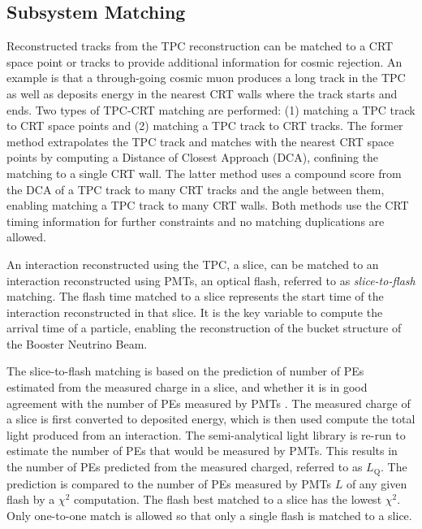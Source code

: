 \subsection{Subsystem Matching}
\label{sec:subsystem_match}


Reconstructed tracks from the TPC reconstruction can be matched to a CRT space point or tracks to provide additional information for cosmic rejection.
An example is that a through-going cosmic muon produces a long track in the TPC as well as deposits energy in the nearest CRT walls where the track starts and ends. 
Two types of TPC-CRT matching are performed: (1) matching a TPC track to CRT space points and (2) matching a TPC track to CRT tracks.
The former method extrapolates the TPC track and matches with the nearest CRT space points by computing a Distance of Closest Approach (DCA), confining the matching to a single CRT wall. 
The latter method uses a compound score from the DCA of a TPC track to many CRT tracks and the angle between them, enabling matching a TPC track to many CRT walls.
Both methods use the CRT timing information for further constraints and no matching duplications are allowed.

An interaction reconstructed using the TPC, a slice, can be matched to an interaction reconstructed using PMTs, an optical flash, referred to as \textit{slice-to-flash} matching.
The flash time matched to a slice represents the start time of the interaction reconstructed in that slice.
It is the key variable to compute the arrival time of a particle, enabling the reconstruction of the bucket structure of the Booster Neutrino Beam.

The slice-to-flash matching is based on the prediction of number of PEs estimated from the measured charge in a slice, and whether it is in good agreement with the number of PEs measured by PMTs \cite{opt0finder_module}.
The measured charge of a slice is first converted to deposited energy, which is then used compute the total light produced from an interaction.
The semi-analytical light library is re-run to estimate the number of PEs that would be measured by PMTs.
This results in the number of PEs predicted from the measured charged, referred to as $L_{\mathrm{Q}}$.
The prediction is compared to the number of PEs measured by PMTs $L$ of any given flash by a $\chi^2$ computation.
The flash best matched to a slice has the lowest $\chi^2$.
Only one-to-one match is allowed so that only a single flash is matched to a slice.

